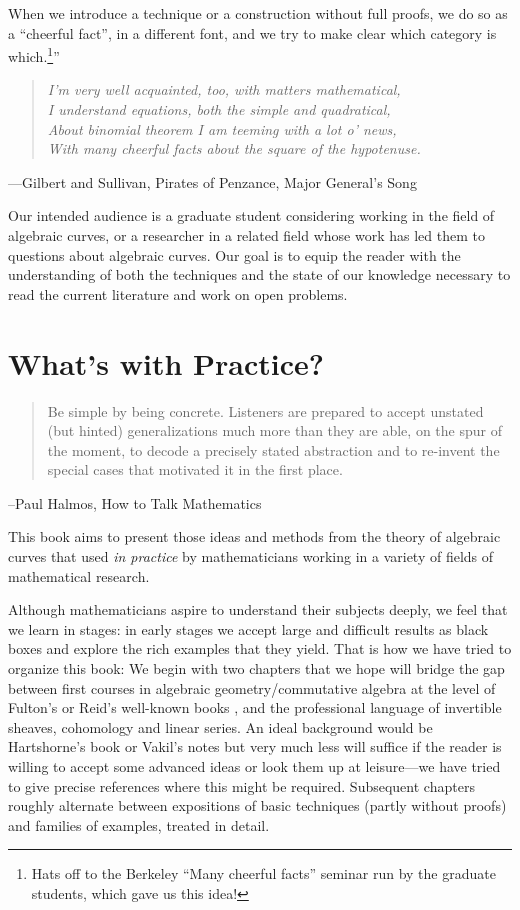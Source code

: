 When we introduce a technique or a construction without full proofs, we do so as a ``cheerful fact'', in a different font, 
and we try to make clear which category is which.\footnote{Hats off to the Berkeley ``Many cheerful facts'' seminar run
by the graduate students, which gave us this idea!}''

\begin{quote}\it{I'm very well acquainted, too, with matters mathematical,\\
I understand equations, both the simple and quadratical,\\
About binomial theorem I am teeming with a lot o' news,\\
With many cheerful facts about the square of the hypotenuse.}
\end{quote}
---Gilbert and Sullivan, Pirates of Penzance, Major General's Song


Our intended audience is a graduate student considering working in the field of algebraic curves, or a researcher in a related field whose work has led them to questions about algebraic curves. Our goal is to equip the reader with the understanding of both the techniques and the state of our knowledge necessary to read the current literature and work on open problems.

\section{What's with Practice?}

\begin{quote}
Be simple by being concrete. Listeners are prepared to
accept unstated (but hinted) generalizations much more than they are able, on the spur of the moment, to
decode a precisely stated abstraction and to re-invent the special cases that motivated it in the first place. 
\end{quote}

--Paul Halmos, How to Talk Mathematics

This book aims to present those ideas and methods from the theory of  algebraic curves that  used \emph{in practice} by mathematicians working in a variety of fields of mathematical research.

Although mathematicians aspire to understand their subjects deeply, we feel that we learn in stages: in early stages we accept large and difficult results as black boxes and explore the rich examples that they yield. That is how we have tried to organize this book: 
We begin with two chapters that we hope will bridge the gap between first courses in algebraic geometry/commutative algebra at the level of Fulton's or  Reid's well-known books \cite{Fulton1989}, \cite{MR982494} and the professional language of invertible sheaves, cohomology and linear series. An ideal background would
be Hartshorne's book \cite{Hartshorne1977} or Vakil's notes \cite{Vakil-notes} but very much less will suffice if the reader is willing to accept some advanced ideas or look them up at leisure---we have tried to give precise references where this might be required. Subsequent chapters roughly alternate between expositions of basic techniques (partly without proofs) and families of examples, treated in detail. 

